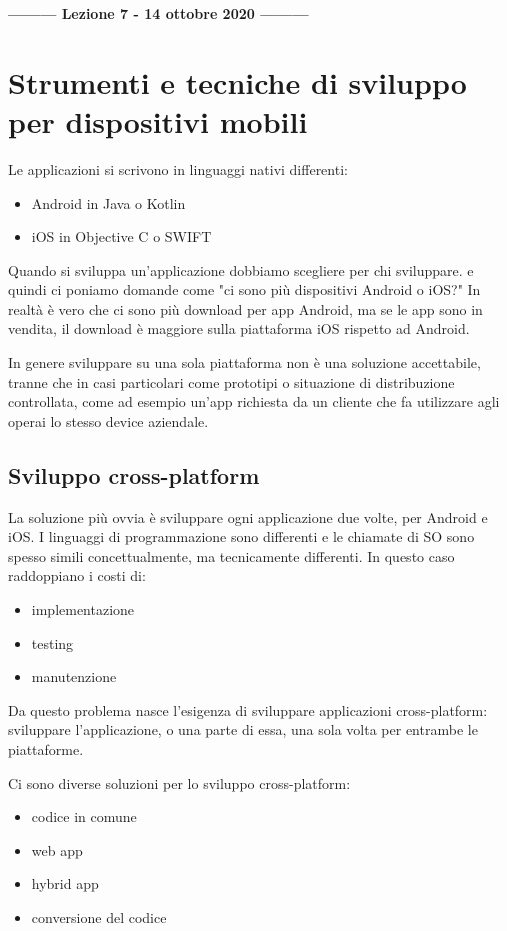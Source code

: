 \begin{center}
    \textbf{--------- Lezione 7 - 14 ottobre 2020 ---------}
\end{center}

\section{Strumenti e tecniche di sviluppo per dispositivi mobili}
Le applicazioni si scrivono in linguaggi nativi differenti: 
\begin{itemize}
    \item Android in Java o Kotlin
    \item iOS in Objective C o SWIFT
\end{itemize}
Quando si sviluppa un'applicazione dobbiamo scegliere per chi sviluppare. e quindi ci poniamo domande come "ci sono più dispositivi Android o iOS?"
In realtà è vero che ci sono più download per app Android, ma se le app sono in vendita, il download è maggiore sulla piattaforma iOS rispetto ad Android. 

In genere sviluppare su una sola piattaforma non è una soluzione accettabile, tranne che in casi particolari come prototipi o situazione di distribuzione controllata, come ad esempio un'app richiesta da un cliente che fa utilizzare agli operai lo stesso device aziendale. 

\subsection{Sviluppo cross-platform}
La soluzione più ovvia è sviluppare ogni applicazione due volte, per Android e iOS. 
I linguaggi di programmazione sono differenti e le chiamate di SO sono spesso simili concettualmente, ma tecnicamente differenti. 
In questo caso raddoppiano i costi di: 
\begin{itemize}
    \item implementazione
    \item testing
    \item manutenzione
\end{itemize}
Da questo problema nasce l'esigenza di sviluppare applicazioni cross-platform: sviluppare l’applicazione, o una parte di essa, una sola volta per entrambe le piattaforme.

Ci sono diverse soluzioni per lo sviluppo cross-platform:
\begin{itemize}
    \item codice in comune 
    \item web app
    \item hybrid app
    \item conversione del codice
\end{itemize}

